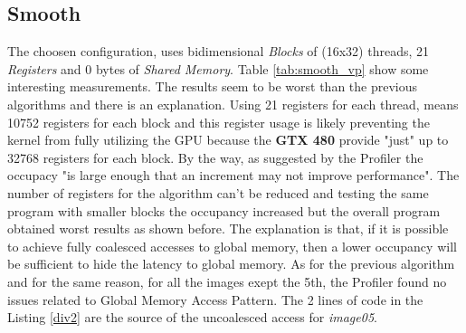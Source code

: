 \documentclass[a4paper]{article}
\begin{document}
\subsection{Smooth}
\label{sec:a3}
The choosen configuration, uses bidimensional \textit{Blocks} of (16x32) threads, 21 \textit{Registers} and 0 bytes of \textit{Shared Memory}. Table \ref{tab:smooth_vp} show some interesting measurements. The results seem to be worst than the previous algorithms and there is an explanation. Using 21 registers for each thread, means 10752 registers for each block and this register usage is likely preventing the kernel from fully utilizing the GPU because the \textbf{GTX 480} provide "just" up to 32768 registers for each block. By the way, as suggested by the Profiler the occupacy "is large enough that an increment may not improve performance". The number of registers for the algorithm can't be reduced and testing the same program with smaller blocks the occupancy increased but the overall program obtained worst results as shown before. The explanation is that, if it is possible to achieve fully coalesced accesses to global memory, then a lower occupancy will be sufficient to hide the latency to global memory. As for the previous algorithm and for the same reason, for all the images exept the 5th, the Profiler found no issues related to Global Memory Access Pattern. The 2 lines of code in the Listing \ref{div2} are the source of the uncoalesced access for \textit{image05}.
\end{document}
